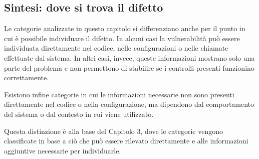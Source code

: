 \subsection{Sintesi: dove si trova il difetto}

Le categorie analizzate in questo capitolo si differenziano anche per il punto in cui è possibile individuare il difetto. In alcuni casi
la vulnerabilità può essere individuata direttamente nel codice, nelle configurazioni o nelle chiamate effettuate dal sistema. In altri casi, invece, queste informazioni mostrano solo una parte del problema e non permettono di stabilire se i controlli presenti funzionino correttamente.

Esistono infine categorie in cui le informazioni
necessarie non sono presenti direttamente nel codice o nella configurazione,
ma dipendono dal comportamento del sistema o dal contesto in cui viene utilizzato.

Questa distinzione è alla base del Capitolo 3,
dove le categorie vengono classificate in base a ciò che può essere rilevato direttamente e
alle informazioni aggiuntive necessarie per individuarle.